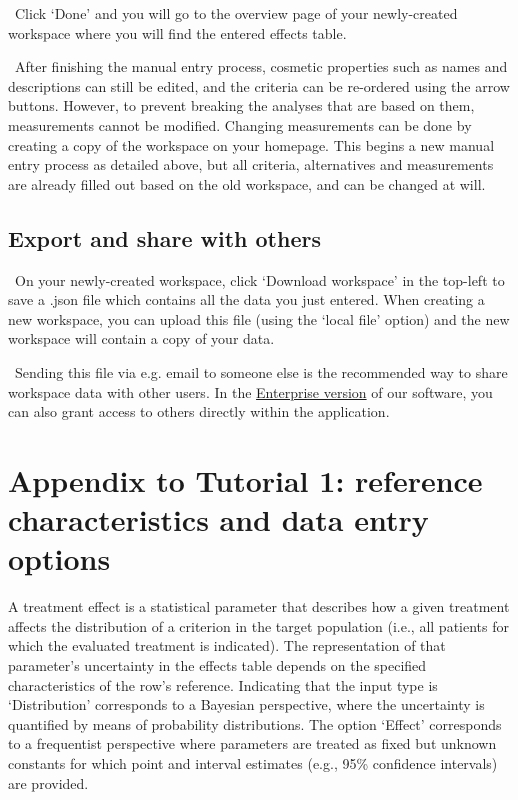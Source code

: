 \documentclass[00_mcda_tutorial.tex]{subfiles}
\begin{document}
\noindent \leftpointright \, Click ‘Done’ and you will go to the overview page of your newly-created workspace where you will find the entered effects table.
\newline

\noindent \faGraduationCap \, After finishing the manual entry process, cosmetic properties such as names and descriptions can still be edited, and the criteria can be re-ordered using the arrow buttons. However, to prevent breaking the analyses that are based on them, measurements cannot be modified. Changing measurements can be done by creating a copy of the workspace on your homepage. This begins a new manual entry process as detailed above, but all criteria, alternatives and measurements are already filled out based on the old workspace, and can be changed at will.

\subsection*{Export and share with others}
\noindent \leftpointright \, On your newly-created workspace, click ‘Download workspace’ in the top-left to save a .json file which contains all the data you just entered. When creating a new workspace, you can upload this file (using the ‘local file’ option) and the new workspace will contain a copy of your data.
\newline

\noindent \faLightbulbO \, Sending this file via e.g. email to someone else is the recommended way to share workspace data with other users. In the \href{http://drugis.org/services/index}{Enterprise version} of our software, you can also grant access to others directly within the application.
\clearpage





\section*{Appendix to Tutorial 1: reference characteristics and data entry options}
\label{appendix1}

A treatment effect is a statistical parameter that describes how a given treatment affects the distribution of a criterion in the target population (i.e., all patients for which the evaluated treatment is indicated). The representation of that parameter’s uncertainty in the effects table depends on the specified characteristics of the row’s reference. Indicating that the input type is ‘Distribution’ corresponds to a Bayesian perspective, where the uncertainty is quantified by means of probability distributions. The option ‘Effect’ corresponds to a frequentist perspective where parameters are treated as fixed but unknown constants for which point and interval estimates (e.g., 95\% confidence intervals) are provided.
\end{document}

